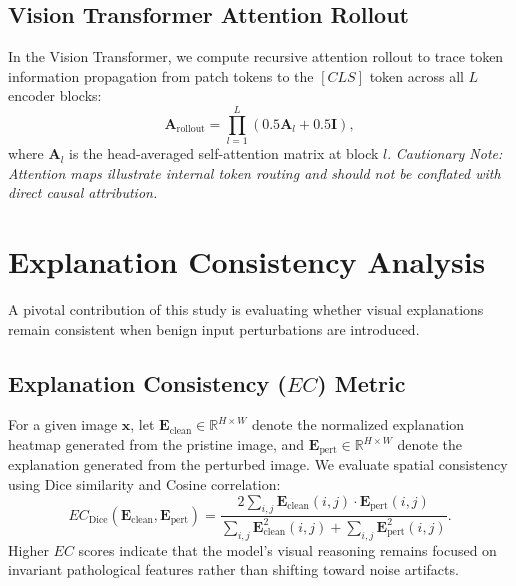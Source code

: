 \documentclass[conference]{IEEEtran}
\begin{document}
\subsection{Vision Transformer Attention Rollout}
In the Vision Transformer, we compute recursive attention rollout to trace token information propagation from patch tokens to the $[CLS]$ token across all $L$ encoder blocks:
\begin{equation}
\mathbf{A}_{\text{rollout}} = \prod_{l=1}^L \left( 0.5 \mathbf{A}_l + 0.5 \mathbf{I} \right),
\end{equation}
where $\mathbf{A}_l$ is the head-averaged self-attention matrix at block $l$. \textit{Cautionary Note: Attention maps illustrate internal token routing and should not be conflated with direct causal attribution.}

\section{Explanation Consistency Analysis}
\label{sec:explanation_consistency}

A pivotal contribution of this study is evaluating whether visual explanations remain consistent when benign input perturbations are introduced.

\subsection{Explanation Consistency ($EC$) Metric}
For a given image $\mathbf{x}$, let $\mathbf{E}_{\text{clean}} \in \mathbb{R}^{H \times W}$ denote the normalized explanation heatmap generated from the pristine image, and $\mathbf{E}_{\text{pert}} \in \mathbb{R}^{H \times W}$ denote the explanation generated from the perturbed image. We evaluate spatial consistency using Dice similarity and Cosine correlation:
\begin{equation}
EC_{\text{Dice}}(\mathbf{E}_{\text{clean}}, \mathbf{E}_{\text{pert}}) = \frac{2 \sum_{i,j} \mathbf{E}_{\text{clean}}(i,j) \cdot \mathbf{E}_{\text{pert}}(i,j)}{\sum_{i,j} \mathbf{E}_{\text{clean}}^2(i,j) + \sum_{i,j} \mathbf{E}_{\text{pert}}^2(i,j)}.
\end{equation}
Higher $EC$ scores indicate that the model's visual reasoning remains focused on invariant pathological features rather than shifting toward noise artifacts.
\end{document}
